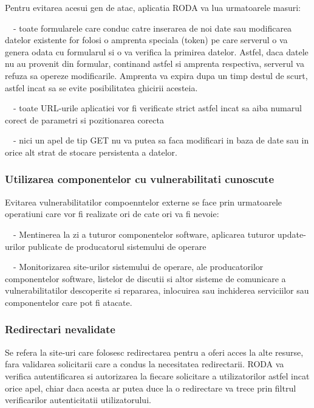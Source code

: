 Pentru evitarea acesui gen de atac, aplicatia RODA va lua urmatoarele masuri:

{\sffamily\color{black}
\ \ {}- toate formularele care conduc catre inserarea de noi date sau modificarea datelor existente for folosi o
amprenta speciala (token) pe care serverul o va genera odata cu formularul si o va verifica la primirea datelor.
Astfel, daca datele nu au provenit din formular, continand astfel si amprenta respectiva, serverul va refuza sa opereze
modificarile. Amprenta va expira dupa un timp destul de scurt, astfel incat sa se evite posibilitatea ghicirii
acesteia. }

{\sffamily\color{black}
\ \ {}- toate URL-urile aplicatiei vor fi verificate strict astfel incat sa aiba
numarul corect de parametri si pozitionarea corecta}

{\sffamily\color{black}
\ \ {}- nici un apel de tip GET nu va putea sa faca modificari in baza de date sau in orice alt strat de stocare
persistenta a datelor. }

\subsubsection{Utilizarea componentelor cu vulnerabilitati cunoscute}

Evitarea vulnerabilitatilor compoenntelor externe se face prin urmatoarele operatiuni care vor fi realizate ori de cate
ori va fi nevoie:

{\sffamily\color{black}
\ \ {}- Mentinerea la zi a tuturor componentelor software, aplicarea tuturor update-urilor publicate de producatorul
sistemului de operare}

{\sffamily\color{black}
\ \ {}- Monitorizarea site-urilor sistemului de operare, ale producatorilor componentelor software, listelor de discutii
si altor sisteme de comunicare a vulnerabilitatilor descoperite si repararea, inlocuirea sau inchiderea serviciilor sau
componentelor care pot fi atacate. }

\subsubsection{Redirectari nevalidate }

Se refera la site-uri care folosesc redirectarea pentru a oferi acces la alte resurse, fara validarea solicitarii care a
condus la necesitatea redirectarii. RODA va verifica autentificarea si autorizarea la fiecare solicitare a
utilizatorilor astfel incat orice apel, chiar daca acesta ar putea duce la o redirectare va trece prin filtrul
verificarilor autenticitatii utilizatorului.
